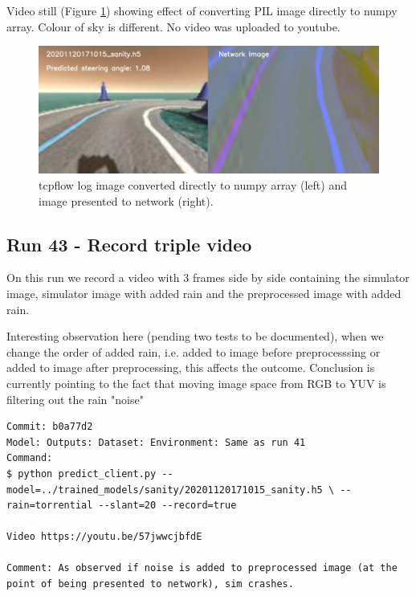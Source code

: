 Video still (Figure \ref{fig:tcpflow_Run42}) showing effect of converting PIL image directly to numpy array. Colour of sky is different.
No video was uploaded to youtube.


\begin{figure}[h!]
\centering
\includegraphics[width=\textwidth]{Figures/tcpflow_Run42.png}
\caption{tcpflow log image converted directly to numpy array (left) and image presented to network (right).}
\label{fig:tcpflow_Run42}
\end{figure}




\subsection{Run 43 - Record triple video}
On this run we record a video with 3 frames side by side containing the simulator image, simulator image with added rain and the preprocessed image with added rain.

Interesting observation here (pending two tests to be documented), when we change the order of added rain, i.e. added to image before preprocesssing or added to image after preprocessing, this affects the outcome. Conclusion is currently pointing to the fact that moving image space from RGB to YUV is filtering out the rain "noise"

\label{app_res:43}
\begin{verbatim}
Commit: b0a77d2
Model: Outputs: Dataset: Environment: Same as run 41 
Command: 
$ python predict_client.py --model=../trained_models/sanity/20201120171015_sanity.h5 \ --rain=torrential --slant=20 --record=true

Video https://youtu.be/57jwwcjbfdE

Comment: As observed if noise is added to preprocessed image (at the point of being presented to network), sim crashes.

\end{verbatim}



